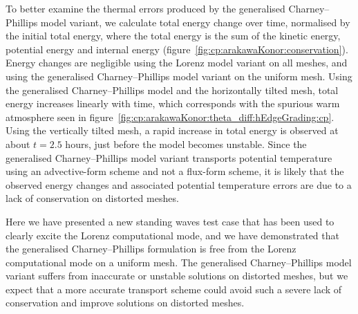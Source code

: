To better examine the thermal errors produced by the generalised Charney--Phillips model variant, we calculate total energy change over time, normalised by the initial total energy, where the total energy is the sum of the kinetic energy, potential energy and internal energy (figure~\ref{fig:cp:arakawaKonor:conservation}).
Energy changes are negligible using the Lorenz model variant on all meshes, and using the generalised Charney--Phillips model variant on the uniform mesh.
Using the generalised Charney--Phillips model and the horizontally tilted mesh, total energy increases linearly with time, which corresponds with the spurious warm atmosphere seen in figure~\ref{fig:cp:arakawaKonor:theta_diff:hEdgeGrading:cp}.
Using the vertically tilted mesh, a rapid increase in total energy is observed at about $t=2.5$ hours, just before the model becomes unstable.
Since the generalised Charney--Phillips model variant transports potential temperature using an advective-form scheme and not a flux-form scheme, it is likely that the observed energy changes and associated potential temperature errors are due to a lack of conservation on distorted meshes.

Here we have presented a new standing waves test case that has been used to clearly excite the Lorenz computational mode, and we have demonstrated that the generalised Charney--Phillips formulation is free from the Lorenz computational mode on a uniform mesh.
The generalised Charney--Phillips model variant suffers from inaccurate or unstable solutions on distorted meshes, but we expect that a more accurate transport scheme could avoid such a severe lack of conservation and improve solutions on distorted meshes.

